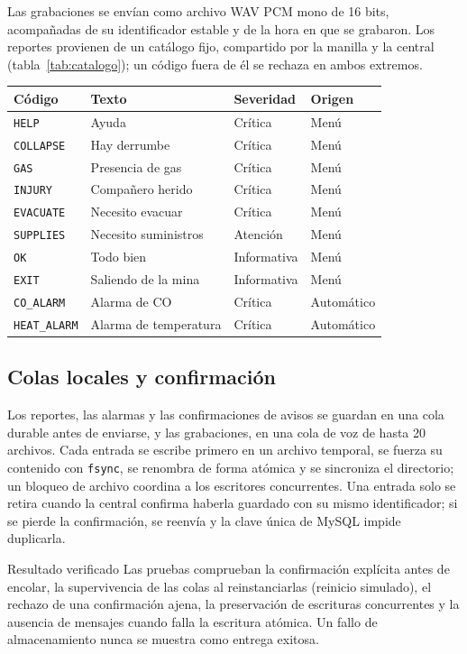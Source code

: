 \documentclass[10pt,a4paper]{article}
\newcommand{\code}[1]{{\small\urlstyle{tt}\nolinkurl{#1}}}
\begin{document}
Las grabaciones se envían como archivo WAV PCM mono de 16 bits, acompañadas de su identificador estable y de la hora en que se grabaron. Los reportes provienen de un catálogo fijo, compartido por la manilla y la central (tabla~\ref{tab:catalogo}); un código fuera de él se rechaza en ambos extremos.

\label{tab:catalogo}
\begin{tabularx}{\linewidth}{@{}P{26mm}P{45mm}P{26mm}Y@{}}
\toprule\textbf{Código} & \textbf{Texto} & \textbf{Severidad} & \textbf{Origen}\\\midrule
\code{HELP} & Ayuda & Crítica & Menú\\
\code{COLLAPSE} & Hay derrumbe & Crítica & Menú\\
\code{GAS} & Presencia de gas & Crítica & Menú\\
\code{INJURY} & Compañero herido & Crítica & Menú\\
\code{EVACUATE} & Necesito evacuar & Crítica & Menú\\
\code{SUPPLIES} & Necesito suministros & Atención & Menú\\
\code{OK} & Todo bien & Informativa & Menú\\
\code{EXIT} & Saliendo de la mina & Informativa & Menú\\
\code{CO_ALARM} & Alarma de CO & Crítica & Automático\\
\code{HEAT_ALARM} & Alarma de temperatura & Crítica & Automático\\\bottomrule
\end{tabularx}

\subsection{Colas locales y confirmación}
Los reportes, las alarmas y las confirmaciones de avisos se guardan en una cola durable antes de enviarse, y las grabaciones, en una cola de voz de hasta 20 archivos. Cada entrada se escribe primero en un archivo temporal, se fuerza su contenido con \code{fsync}, se renombra de forma atómica y se sincroniza el directorio; un bloqueo de archivo coordina a los escritores concurrentes. Una entrada solo se retira cuando la central confirma haberla guardado con su mismo identificador; si se pierde la confirmación, se reenvía y la clave única de MySQL impide duplicarla.

\begin{insight}{Resultado verificado}
Las pruebas comprueban la confirmación explícita antes de encolar, la supervivencia de las colas al reinstanciarlas (reinicio simulado), el rechazo de una confirmación ajena, la preservación de escrituras concurrentes y la ausencia de mensajes cuando falla la escritura atómica. Un fallo de almacenamiento nunca se muestra como entrega exitosa.
\end{insight}
\end{document}

